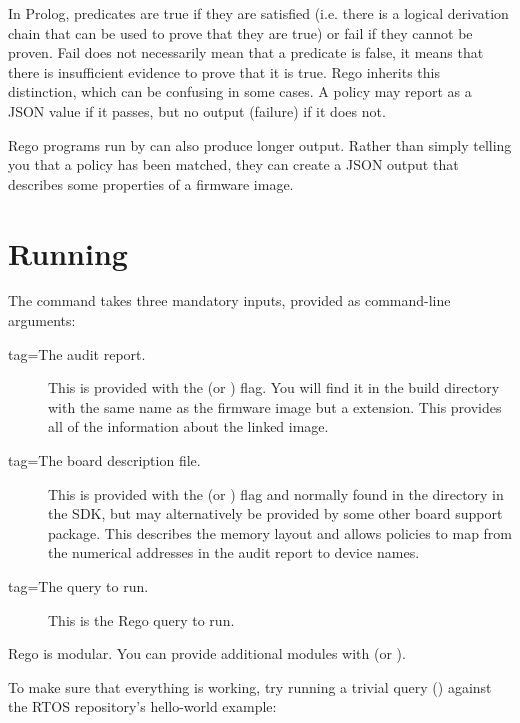 \begin{note}
	In Prolog, predicates are true if they are satisfied (i.e. there is a logical derivation chain that can be used to prove that they are true) or fail if they cannot be proven.
	Fail does not necessarily mean that a predicate is false, it means that there is insufficient evidence to prove that it is true.
	Rego inherits this distinction, which can be confusing in some cases.
	A policy may report  as a JSON value if it passes, but no output (failure) if it does not.
\end{note}

Rego programs run by  can also produce longer output.
Rather than simply telling you that a policy has been matched, they can create a JSON output that describes some properties of a firmware image.

\section{Running }

The  command takes three mandatory inputs, provided as command-line arguments:

\begin{description}
	\item[tag=The audit report.]{ This is provided with the  (or ) flag.
		You will find it in the build directory with the same name as the firmware image but a  extension.
		This provides all of the information about the linked image.}
	\item[tag=The board description file.]{ This is provided with the  (or ) flag and normally found in the  directory in the SDK, but may alternatively be provided by some other board support package.
		This describes the memory layout and allows policies to map from the numerical addresses in the audit report to device names.}
	\item[tag=The query to run.]{ This is the Rego query to run.}
\end{description}

Rego is modular.
You can provide additional modules with  (or ).

To make sure that everything is working, try running a trivial query () against the RTOS repository's hello-world example:

